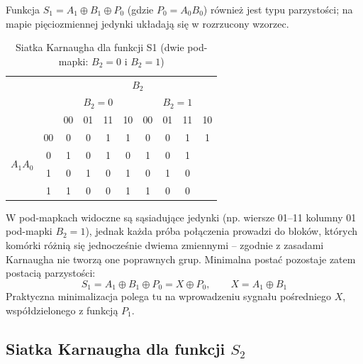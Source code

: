 \documentclass[11pt]{article}
\begin{document}
Funkcja \(S_1 = A_1 \oplus B_1 \oplus P_0\) (gdzie \(P_0 = A_0 B_0\)) również jest typu parzystości; na mapie pięciozmiennej jedynki układają się w rozrzucony wzorzec.
\begin{table}[H]
\centering
\caption{Siatka Karnaugha dla funkcji S1 (dwie pod-mapki: $B_2=0$ i $B_2=1$)}
\label{tab:kmap_S1}
\setlength{\tabcolsep}{5.5pt}
\begin{tabular}{cc|c|c|c|c|c|c|c|c}
\multicolumn{2}{c}{} & \multicolumn{8}{c}{$B_2$} \\
\multicolumn{2}{c}{} & \multicolumn{4}{c}{$B_2=0$} & \multicolumn{4}{c}{$B_2=1$} \\
\multicolumn{2}{c}{} & 00 & 01 & 11 & 10 & 00 & 01 & 11 & 10 \\
\hline
\multirow{4}{*}{$A_1A_0$} & 00 & 0 & 0 & 1 & 1 & 0 & 0 & 1 & 1 \\
01 & 0 & 1 & 0 & 1 & 0 & 1 & 0 & 1 \\
11 & 1 & 0 & 1 & 0 & 1 & 0 & 1 & 0 \\
10 & 1 & 1 & 0 & 0 & 1 & 1 & 0 & 0 \\
\hline
\end{tabular}
\end{table}

W pod-mapkach widoczne są sąsiadujące jedynki (np. wiersze 01--11 kolumny 01 pod-mapki \(B_2=1\)), jednak każda próba połączenia prowadzi do bloków, których komórki różnią się jednocześnie dwiema zmiennymi -- zgodnie z zasadami Karnaugha nie tworzą one poprawnych grup. Minimalna postać pozostaje zatem postacią parzystości:
\begin{equation}
S_1 = A_1 \oplus B_1 \oplus P_0 = X \oplus P_0, \qquad X = A_1 \oplus B_1
\end{equation}
Praktyczna minimalizacja polega tu na wprowadzeniu sygnału pośredniego \(X\), współdzielonego z funkcją \(P_1\).
\subsection{Siatka Karnaugha dla funkcji \(S_2\)}
\end{document}

